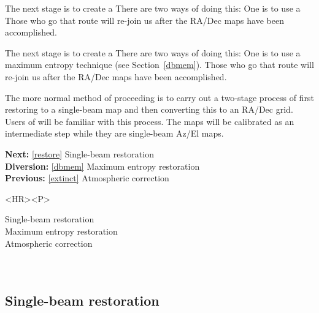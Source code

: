 \begin{htmlonly}
   The next stage is to create a
   There are two ways of doing this: One is to use a
   Those who go that route will re-join us
   after the RA/Dec maps have been accomplished.
\end{htmlonly}
\begin{latexonly}
   The next stage is to create a
   There are two ways of doing this: One is to use a
   maximum entropy technique
(see Section~\ref{dbmem}).
   Those who go that route will re-join us
   after the RA/Dec maps have been accomplished.
\end{latexonly}

   The more normal method of proceeding
   is to carry out a two-stage process of first restoring to a single-beam map
   and then converting this to an RA/Dec grid. Users of
   will be familiar with this process. The maps will be calibrated as an
   intermediate step while they are single-beam Az/El maps.

\begin{latexonly}
{\bf Next:} \ref{restore} Single-beam restoration\\
{\bf Diversion:} \ref{dbmem} Maximum entropy restoration\\
{\bf Previous:} \ref{extinct} Atmospheric correction\\
\end{latexonly}

\begin{htmlonly}
\begin{rawhtml} <HR><P> \end{rawhtml}
{\bf {}} Single-beam restoration\\
{\bf {}} Maximum entropy restoration\\
{\bf {}} Atmospheric correction\\
{\bf {}}\\
{\bf {}}\\
\end{htmlonly}


\subsection{\label{restore}Single-beam restoration}


